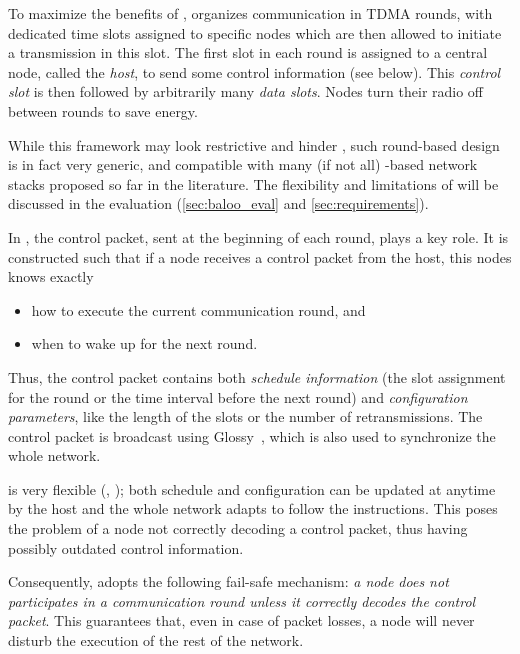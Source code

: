 To maximize the benefits of \ST, \baloo organizes communication in
TDMA rounds, with dedicated time slots assigned to specific nodes which are then allowed to initiate a transmission in this slot.
The first slot in each round is assigned to a central node, called the \textsl{host}, to send some control information (see below). This \textsl{control slot} is then followed by arbitrarily many \textsl{data slots}.
Nodes turn their radio off between rounds to save energy.

While this framework may look restrictive and hinder , such round-based design is in fact very generic, and compatible with many (if not all) \ST-based network stacks proposed so far in the literature. The flexibility and limitations of \baloo will be discussed in the evaluation (\cref{sec:baloo_eval} and \ref{sec:requirements}).

In \baloo, the control packet, sent at the beginning of each round, plays a key role. It is constructed such that if a node receives a control packet from the host, this nodes knows exactly
\begin{itemize}
	\item how to execute the current communication round, and
	\item when to wake up for the next round.
\end{itemize}

Thus, the control packet contains both \textsl{schedule information} (\eg the slot assignment for the round or the time interval before the next round) and \textsl{configuration parameters}, like the length of the slots or the number of retransmissions.
The control packet is broadcast using Glossy~\cite{ferrari2011Glossy}, which is also used to synchronize the whole network.

\baloo is very flexible (, ); both schedule and configuration can be updated at anytime by the host and the whole network adapts to follow the instructions.
This poses the problem of a node not correctly decoding a control packet, thus having possibly outdated control information.

Consequently, \baloo adopts the following fail-safe mechanism: \textsl{a node does not participates in a communication round unless it correctly decodes the control packet}. This guarantees that, even in case of packet losses, a node will never disturb the execution of the rest of the network.


